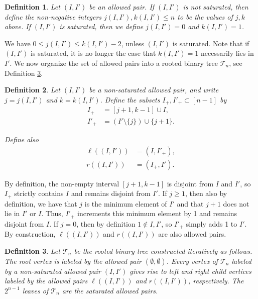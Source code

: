 \documentclass[12pt]{amsart}
\newtheorem{definition}{Definition}[subsection]
\newcommand{\cT}{\mathcal{T}}
\newcommand{\GC}[1]{{\color{brown}Grace: #1}}
\begin{document}
\begin{definition}\label{def:jk}
Let $(I,I')$ be an allowed pair. If $(I,I')$ is not saturated, then define the non-negative integers $j(I,I'),k(I,I')\le n$ to be the values of $j,k$ above. If $(I,I')$ is saturated, then we define $j(I,I')=0$ and $k(I,I')=1$.
\end{definition}

We have $0\le j(I,I')\le k(I,I')-2$, unless $(I,I')$ is saturated. Note that if $(I,I')$ is saturated, it is no longer the case that $k(I,I')=1$ necessarily lies in $I'$. We now organize the set of allowed pairs into a rooted binary tree $\cT_n$, see Definition \ref{def:T_n}.
\begin{definition}\label{def:tree_successors}
    Let $(I,I')$ be a non-saturated allowed pair, and write $j=j(I,I')$ and $k=k(I,I')$. Define the subsets $I_+, I'_+ \subset [n-1]$ by
\begin{align*}
    I_+ &= [j+1,k-1]\cup I,\\
    I'_+ &= (I' \setminus \{j\}) \cup\{j+1\}.
\end{align*}

Define also
\begin{align*}
    \ell((I,I'))&=(I,I'_+),\\
    r((I,I'))&=(I_+,I').
\end{align*}
\end{definition}

By definition, the non-empty interval $[j+1,k-1]$ is disjoint from $I$ and $I'$, so $I_+$ strictly contains $I$ and remains disjoint from $I'$. If $j\ge1$, then also by definition, we have that $j$ is the minimum element of $I'$ and that $j+1$ does not lie in $I'$ or $I$. Thus, $I'_+$ increments this minimum element by 1 and remains disjoint from $I$. If $j=0$, then by definition $1\notin I,I'$, so $I'_+$ simply adds 1 to $I'$. By construction, $\ell((I,I'))$ and $r((I,I'))$ are also allowed pairs.

\begin{definition}\label{def:T_n}
    Let $\cT_n$ be the rooted binary tree constructed iteratively as follows. The root vertex is labeled by the allowed pair $(\emptyset,\emptyset)$. Every vertex of $\cT_n$ labeled by a non-saturated allowed pair $(I,I')$ gives rise to left and right child vertices labeled by the allowed pairs $\ell((I,I'))$ and $r((I,I'))$, respectively. The $2^{n-1}$ leaves of $\cT_n$ are the saturated allowed pairs.
\end{definition}
\end{document}
